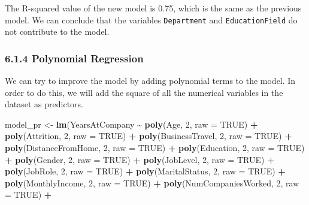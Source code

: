 \documentclass[
]{article}
\newenvironment{Shaded}{\begin{snugshade}}{\end{snugshade}}
\newcommand{\AttributeTok}[1]{\textcolor[rgb]{0.13,0.29,0.53}{#1}}
\newcommand{\ConstantTok}[1]{\textcolor[rgb]{0.56,0.35,0.01}{#1}}
\newcommand{\DecValTok}[1]{\textcolor[rgb]{0.00,0.00,0.81}{#1}}
\newcommand{\FunctionTok}[1]{\textcolor[rgb]{0.13,0.29,0.53}{\textbf{#1}}}
\newcommand{\NormalTok}[1]{#1}
\newcommand{\OtherTok}[1]{\textcolor[rgb]{0.56,0.35,0.01}{#1}}
\newcommand{\SpecialCharTok}[1]{\textcolor[rgb]{0.81,0.36,0.00}{\textbf{#1}}}
\begin{document}
The R-squared value of the new model is 0.75, which is the same as the
previous model. We can conclude that the variables \texttt{Department}
and \texttt{EducationField} do not contribute to the model.

\hypertarget{polynomial-regression}{%
\subsubsection{6.1.4 Polynomial
Regression}\label{polynomial-regression}}

We can try to improve the model by adding polynomial terms to the model.
In order to do this, we will add the square of all the numerical
variables in the dataset as predictors.

\begin{Shaded}
\begin{Highlighting}[]
\NormalTok{model\_pr }\OtherTok{\textless{}{-}} \FunctionTok{lm}\NormalTok{(YearsAtCompany }\SpecialCharTok{\textasciitilde{}} 
               \FunctionTok{poly}\NormalTok{(Age, }\DecValTok{2}\NormalTok{, }\AttributeTok{raw =} \ConstantTok{TRUE}\NormalTok{) }\SpecialCharTok{+} 
               \FunctionTok{poly}\NormalTok{(Attrition, }\DecValTok{2}\NormalTok{, }\AttributeTok{raw =} \ConstantTok{TRUE}\NormalTok{) }\SpecialCharTok{+} 
               \FunctionTok{poly}\NormalTok{(BusinessTravel, }\DecValTok{2}\NormalTok{, }\AttributeTok{raw =} \ConstantTok{TRUE}\NormalTok{) }\SpecialCharTok{+} 
               \FunctionTok{poly}\NormalTok{(DistanceFromHome, }\DecValTok{2}\NormalTok{, }\AttributeTok{raw =} \ConstantTok{TRUE}\NormalTok{) }\SpecialCharTok{+} 
               \FunctionTok{poly}\NormalTok{(Education, }\DecValTok{2}\NormalTok{, }\AttributeTok{raw =} \ConstantTok{TRUE}\NormalTok{) }\SpecialCharTok{+} 
               \FunctionTok{poly}\NormalTok{(Gender, }\DecValTok{2}\NormalTok{, }\AttributeTok{raw =} \ConstantTok{TRUE}\NormalTok{) }\SpecialCharTok{+} 
               \FunctionTok{poly}\NormalTok{(JobLevel, }\DecValTok{2}\NormalTok{, }\AttributeTok{raw =} \ConstantTok{TRUE}\NormalTok{) }\SpecialCharTok{+} 
               \FunctionTok{poly}\NormalTok{(JobRole, }\DecValTok{2}\NormalTok{, }\AttributeTok{raw =} \ConstantTok{TRUE}\NormalTok{) }\SpecialCharTok{+} 
               \FunctionTok{poly}\NormalTok{(MaritalStatus, }\DecValTok{2}\NormalTok{, }\AttributeTok{raw =} \ConstantTok{TRUE}\NormalTok{) }\SpecialCharTok{+} 
               \FunctionTok{poly}\NormalTok{(MonthlyIncome, }\DecValTok{2}\NormalTok{, }\AttributeTok{raw =} \ConstantTok{TRUE}\NormalTok{) }\SpecialCharTok{+} 
               \FunctionTok{poly}\NormalTok{(NumCompaniesWorked, }\DecValTok{2}\NormalTok{, }\AttributeTok{raw =} \ConstantTok{TRUE}\NormalTok{) }\SpecialCharTok{+} 

\end{Highlighting}
\end{Shaded}
\end{document}
